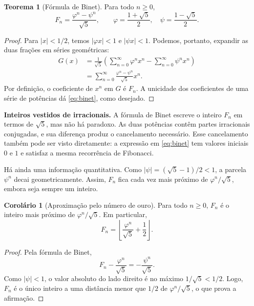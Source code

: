 \documentclass[12pt,portuguese]{article}
\theoremstyle{definition}
\newtheorem{theorem}{Teorema}
\newtheorem{corollary}[corollary]{Corolário}
\theoremstyle{plainexercise}
\theoremstyle{starredexercise}
\theoremstyle{definition}
\begin{document}
\begin{theorem}[Fórmula de Binet]\label{thm:binet}
Para todo $n\geqslant 0$,
\begin{equation}\label{eq:binet}
F_n=\frac{\varphi^n-\psi^n}{\sqrt{5}},
\qquad
\varphi=\frac{1+\sqrt{5}}{2},
\quad
\psi=\frac{1-\sqrt{5}}{2}.
\end{equation}
\end{theorem}

\begin{proof}
Para $|x|<1/2$, temos $|\varphi x|<1$ e $|\psi x|<1$. Podemos, portanto,
expandir as duas frações em séries geométricas:
\begin{align*}
G(x)
&=\frac{1}{\sqrt{5}}
\left(
\sum_{n=0}^{\infty}\varphi^nx^n
-\sum_{n=0}^{\infty}\psi^nx^n
\right)
\\[0.3cm]
&=\sum_{n=0}^{\infty}
\frac{\varphi^n-\psi^n}{\sqrt{5}}x^n.
\end{align*}
Por definição, o coeficiente de $x^n$ em $G$ é $F_n$. A unicidade dos
coeficientes de uma série de potências dá \eqref{eq:binet}, como desejado.
\end{proof}

\medskip
\noindent\textbf{Inteiros vestidos de irracionais.}
A fórmula de Binet escreve o inteiro $F_n$ em termos de $\sqrt{5}$, mas não há
paradoxo. As duas potências contêm partes irracionais conjugadas, e sua
diferença produz o cancelamento necessário. Esse cancelamento também pode ser
visto diretamente: a expressão em \eqref{eq:binet} tem valores iniciais $0$ e
$1$ e satisfaz a mesma recorrência de Fibonacci.

Há ainda uma informação quantitativa. Como
$|\psi|=(\sqrt{5}-1)/2<1$, a parcela $\psi^n$ decai geometricamente. Assim,
$F_n$ fica cada vez mais próximo de $\varphi^n/\sqrt{5}$, embora seja sempre
um inteiro.

\begin{corollary}[Aproximação pelo número de ouro]\label{cor:aprox-fib}
Para todo $n\geqslant 0$, $F_n$ é o inteiro mais próximo de
$\varphi^n/\sqrt{5}$. Em particular,
\[
F_n=\left\lfloor\frac{\varphi^n}{\sqrt{5}}+\frac{1}{2}\right\rfloor.
\]
\end{corollary}

\begin{proof}
Pela fórmula de Binet,
\[
F_n-\frac{\varphi^n}{\sqrt{5}}
=-\frac{\psi^n}{\sqrt{5}}.
\]
Como $|\psi|<1$, o valor absoluto do lado direito é no máximo
$1/\sqrt{5}<1/2$. Logo, $F_n$ é o único inteiro a uma distância menor que
$1/2$ de $\varphi^n/\sqrt{5}$, o que prova a afirmação.
\end{proof}
\end{document}

